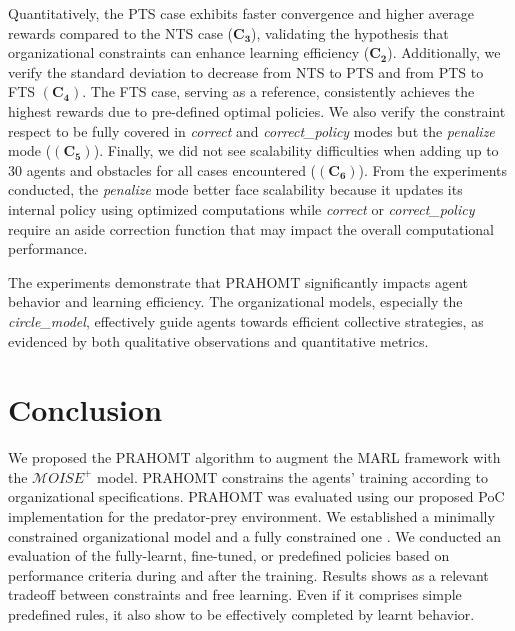 \documentclass[runningheads]{llncs}
\theoremstyle{freethm}
\theoremstyle{proofoutline}
\begin{document}
Quantitatively, the PTS case exhibits faster convergence and higher average rewards compared to the NTS case ($\mathbf{C_3}$), validating the hypothesis that organizational constraints can enhance learning efficiency ($\mathbf{C_2}$). Additionally, we verify the standard deviation to decrease from NTS to PTS and from PTS to FTS $(\mathbf{C_4})$.
The FTS case, serving as a reference, consistently achieves the highest rewards due to pre-defined optimal policies. We also verify the constraint respect to be fully covered in \textit{correct} and \textit{correct\_policy} modes but the \textit{penalize} mode ($(\mathbf{C_5})$). Finally, we did not see scalability difficulties when adding up to 30 agents and obstacles for all cases encountered ($(\mathbf{C_6})$). From the experiments conducted, the \textit{penalize} mode better face scalability because it updates its internal policy using optimized computations while \textit{correct} or \textit{correct\_policy} require an aside correction function that may impact the overall computational performance.

The experiments demonstrate that PRAHOMT significantly impacts agent behavior and learning efficiency. The organizational models, especially the \textit{circle\_model}, effectively guide agents towards efficient collective strategies, as evidenced by both qualitative observations and quantitative metrics.


\section{Conclusion}\label{sec:conclusion}


We proposed the PRAHOMT algorithm to augment the MARL framework with the $\mathcal{M}OISE^+$ model. PRAHOMT constrains the agents' training according to organizational specifications. PRAHOMT was evaluated using our proposed PoC implementation for the  predator-prey environment. We established a minimally constrained organizational model  and a fully constrained one . We conducted an evaluation of the fully-learnt, fine-tuned, or predefined policies based on performance criteria during and after the training.
%
Results shows  as a relevant tradeoff between constraints and free learning. Even if it comprises simple predefined rules, it also show to be effectively completed by learnt behavior.
\end{document}
